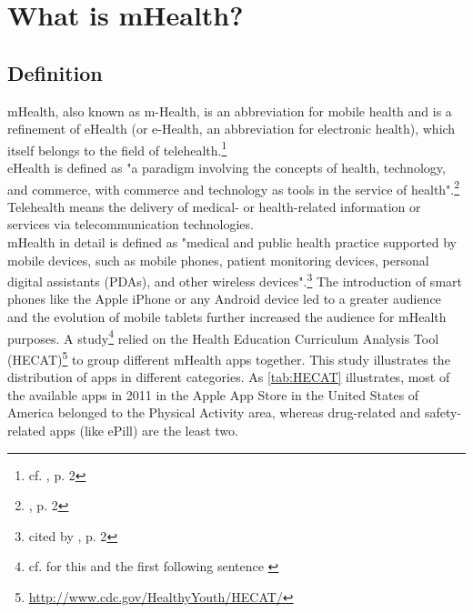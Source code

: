 \section{What is mHealth?}

\subsection{Definition}
mHealth, also known as m-Health, is an abbreviation for mobile health and is a refinement of eHealth (or e-Health, an abbreviation for electronic health), which itself belongs to the field of telehealth.\footnote{cf. \cite{MartinezPerez.2013}, p. 2}
\\
eHealth is defined as "a paradigm involving the concepts of health, technology, and commerce, with commerce and technology as tools in the service of health".\footnote{\cite{MartinezPerez.2013}, p. 2}
\\
Telehealth means the delivery of medical- or health-related information or services via telecommunication technologies.
\\
mHealth in detail is defined as "medical and public health practice supported by mobile devices, such as mobile phones, patient monitoring devices, personal digital assistants (PDAs), and other wireless devices".\footnote{\cite{WorldHealthOrganization.2011} cited by \cite{MartinezPerez.2013}, p. 2} The introduction of smart phones like the Apple iPhone or any Android device led to a greater audience and the evolution of mobile tablets further increased the audience for mHealth purposes. A study\footnote{cf. for this and the first following sentence \cite{West.2012}} relied on the Health Education Curriculum Analysis Tool (HECAT)\footnote{\url{http://www.cdc.gov/HealthyYouth/HECAT/}} to group different mHealth apps together. This study illustrates the distribution of apps in different categories. As \ref{tab:HECAT} illustrates, most of the available apps in 2011 in the Apple App Store in the United States of America belonged to the Physical Activity area, whereas drug-related and safety-related apps (like ePill) are the least two. 

